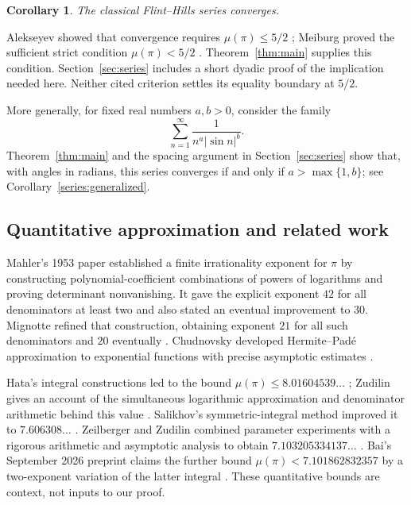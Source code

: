 \documentclass[11pt]{article}
\newtheorem{corollary}[theorem]{Corollary}
\theoremstyle{definition}
\theoremstyle{remark}
\numberwithin{equation}{section}
\begin{document}
\begin{corollary}\label{thm:flinthills}
The classical Flint--Hills series converges.
\end{corollary}

Alekseyev showed that convergence requires
\(\mu(\pi)\le5/2\) \cite[Corollary~4]{alekseyev};
Meiburg proved the sufficient strict condition \(\mu(\pi)<5/2\)
\cite[Theorem~2.5]{meiburg}. Theorem~\ref{thm:main} supplies this
condition. Section~\ref{sec:series} includes a short dyadic proof of the
implication needed here. Neither cited criterion settles its equality
boundary at \(5/2\).

More generally, for fixed real numbers \(a,b>0\), consider the family
\[
\sum_{n=1}^{\infty}\frac{1}{n^a|\sin n|^b}.
\]
Theorem~\ref{thm:main} and the spacing argument in
Section~\ref{sec:series} show that, with angles in radians, this series
converges if and only if \(a>\max\{1,b\}\); see
Corollary~\ref{series:generalized}.

\subsection{Quantitative approximation and related work}

Mahler's 1953 paper \cite{mahler1953} established a finite irrationality
exponent for \(\pi\) by constructing polynomial-coefficient combinations
of powers of logarithms and proving determinant nonvanishing. It gave the explicit
exponent \(42\) for all denominators at least two and also stated an
eventual improvement to \(30\). Mignotte refined that construction,
obtaining exponent \(21\) for all such denominators and \(20\)
eventually \cite[Theorem~1]{mignotte1974}. Chudnovsky developed
Hermite--Pad\'e approximation to exponential functions with precise
asymptotic estimates \cite{chudnovsky1982}.

Hata's integral constructions led to the bound
\(\mu(\pi)\le8.01604539\ldots\) \cite{hata1993}; Zudilin gives
an account of the simultaneous logarithmic approximation and denominator
arithmetic behind this value \cite[Theorem~2]{zudilin2004}.
Salikhov's symmetric-integral method improved it to
\(7.606308\ldots\) \cite{salikhov,salikhov2010}.
Zeilberger and Zudilin combined parameter experiments with a rigorous
arithmetic and asymptotic analysis to obtain
\(7.103205334137\ldots\) \cite{zeilbergerzudilin}.
Bai's September 2026 preprint claims the further bound
\(\mu(\pi)<7.101862832357\) by a two-exponent variation of the latter
integral \cite{Bai2026}. These quantitative bounds are context, not
inputs to our proof.
\end{document}
